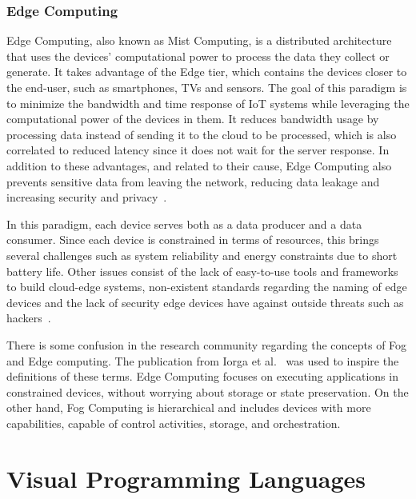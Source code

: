 \subsubsection{Edge Computing}\label{sec:edge_computing}

Edge Computing, also known as Mist Computing, is a distributed architecture that uses the devices' computational power to process the data they collect or generate. It takes advantage of the Edge tier, which contains the devices closer to the end-user, such as smartphones, TVs and sensors. The goal of this paradigm is to minimize the bandwidth and time response of IoT systems while leveraging the computational power of the devices in them. It reduces bandwidth usage by processing data instead of sending it to the cloud to be processed, which is also correlated to reduced latency since it does not wait for the server response. In addition to these advantages, and related to their cause, Edge Computing also prevents sensitive data from leaving the network, reducing data leakage and increasing security and privacy~\cite{edge_computing, edge_computing_2019}.

In this paradigm, each device serves both as a data producer and a data consumer. Since each device is constrained in terms of resources, this brings several challenges such as system reliability and energy constraints due to short battery life. Other issues consist of the lack of easy-to-use tools and frameworks to build cloud-edge systems, non-existent standards regarding the naming of edge devices and the lack of security edge devices have against outside threats such as hackers~\cite{promise_of_edge_computing}.

There is some confusion in the research community regarding the concepts of Fog and Edge computing. The publication from Iorga et al.~\cite{fog_edge_differences} was used to inspire the definitions of these terms. Edge Computing focuses on executing applications in constrained devices, without worrying about storage or state preservation. On the other hand, Fog Computing is hierarchical and includes devices with more capabilities, capable of control activities, storage, and orchestration.



\section{Visual Programming Languages}\label{sec:background_vpl}

